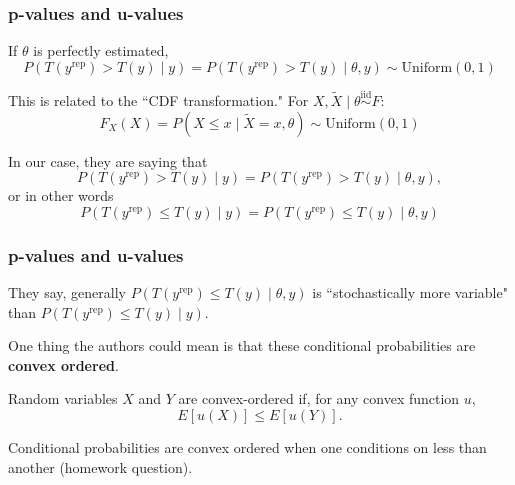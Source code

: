 \documentclass{beamer}
\begin{document}
\begin{frame}[fragile]
\frametitle{p-values and u-values}

If $\theta$ is perfectly estimated, 
$$
P(T(y^{\text{rep} } ) > T(y ) \mid y) = P(T(y^{\text{rep} } ) > T(y ) \mid \theta, y) \sim \text{Uniform}(0,1)
$$
\newline

This is related to the ``CDF transformation." For $X, \tilde{X} \mid \theta \overset{\text{iid}}{\sim} F$: 
$$
F_X(X) = P(X \le x \mid \tilde{X} = x, \theta) \sim \text{Uniform}(0,1)
$$


In our case, they are saying that 
$$
P(T(y^{\text{rep}}) > T(y) \mid y) = P(T(y^{\text{rep}}) > T(y) \mid \theta, y),
$$
or in other words
$$
P(T(y^{\text{rep}}) \le T(y) \mid y) = P(T(y^{\text{rep}}) \le T(y) \mid \theta, y) 
$$


\end{frame}

\begin{frame}[fragile]
\frametitle{p-values and u-values}

They say, generally $P(T(y^{\text{rep}}) \le T(y) \mid \theta, y)$ is ``stochastically more variable" than $P(T(y^{\text{rep}}) \le T(y) \mid y)$. 
\newline

One thing the authors \*could\* mean is that these conditional probabilities are {\bf convex ordered}. 
\newline


Random variables $X$ and $Y$ are convex-ordered if, for any convex function $u$, 
$$
E\left[u(X) \right] \le E\left[ u(Y) \right].
$$

Conditional probabilities are convex ordered when one conditions on less than another (homework question).

\end{frame}
\end{document}
